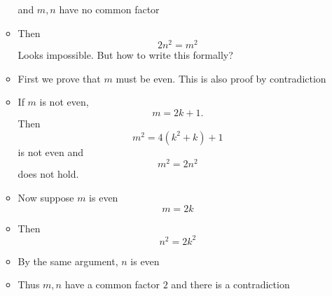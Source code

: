 \begin{frame}[allowframebreaks]
\begin{itemize}
\begin{itemize}
\begin{equation*}
    \end{equation*}
    and
    $m,n$ have no common factor
  \item Then
    \begin{equation*}
      2n^2=m^2
    \end{equation*}
Looks impossible. But how to write this formally?
\item First we prove that $m$ must be even. This is also proof by
  contradiction
\item [] If $m$ is not even, 
  \begin{equation*}
    m = 2k + 1.
  \end{equation*}
Then
\begin{equation*}
  m^2 = 4(k^2 + k) + 1
\end{equation*}
is not even and
\begin{equation*}
  m^2 = 2n^2
\end{equation*}
does not hold.
\item Now suppose $m$ is even
  $$m=2k$$
\item [] Then
  \begin{equation*}
    n^2 = 2k^2
  \end{equation*}
\item By the same argument, $n$ is even
\item Thus $m, n$ have a common factor $2$ and there
is a contradiction
  \end{itemize}

\end{itemize}\end{frame}



